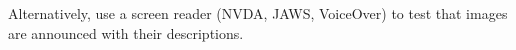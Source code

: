 \documentclass[12pt,letterpaper]{article}
\begin{document}
Alternatively, use a screen reader (NVDA, JAWS, VoiceOver) to test that
images are announced with their descriptions.


\printbibliography
\end{document}
